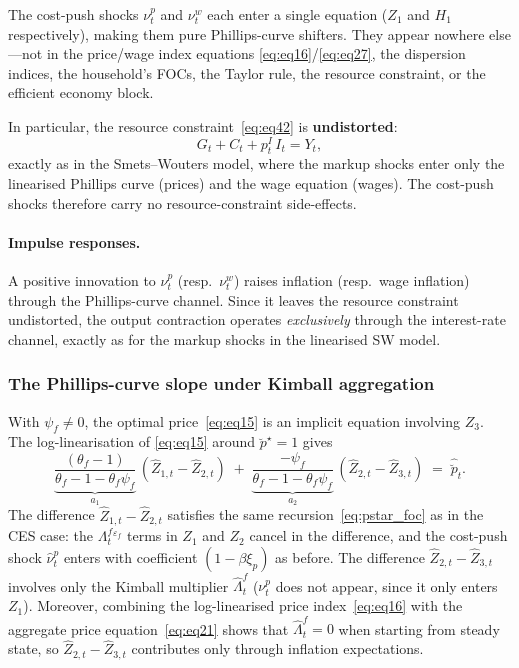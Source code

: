 \documentclass[11pt,a4paper]{article}
\renewcommand{\ss}{\star}
\begin{document}
\noindent
The cost-push shocks $\nu^p_t$ and $\nu^w_t$ each enter a single
equation ($Z_1$ and $H_1$ respectively), making them pure Phillips-curve
shifters.  They appear nowhere else---not in the price/wage index
equations \eqref{eq:eq16}/\eqref{eq:eq27}, the dispersion indices, the
household's FOCs, the Taylor rule, the resource constraint, or the
efficient economy block.

In particular, the resource constraint~\eqref{eq:eq42} is
\textbf{undistorted}:
\[
  G_t + C_t + p^I_t\,I_t = Y_t,
\]
exactly as in the Smets--Wouters model, where the markup shocks enter
only the linearised Phillips curve (prices) and the wage equation
(wages). The cost-push shocks therefore carry no resource-constraint
side-effects.

\paragraph{Impulse responses.}
A positive innovation to $\nu^p_t$ (resp.\ $\nu^w_t$) raises inflation
(resp.\ wage inflation) through the Phillips-curve channel.  Since it
leaves the resource constraint undistorted, the output contraction
operates \emph{exclusively} through the interest-rate channel, exactly
as for the markup shocks in the linearised SW model.

\subsubsection{The Phillips-curve slope under Kimball aggregation}
\label{sec:kimball_slope}

With $\psi_f \neq 0$, the optimal price~\eqref{eq:eq15} is an
implicit equation involving $Z_3$.  The log-linearisation of
\eqref{eq:eq15} around $\breve p^\ss = 1$ gives
\[
  \underbrace{\frac{(\theta_f-1)}
    {\theta_f-1-\theta_f\psi_f}}_{\displaystyle a_1}
  \,(\hat Z_{1,t} - \hat Z_{2,t})
  \;+\;
  \underbrace{\frac{-\psi_f}
    {\theta_f-1-\theta_f\psi_f}}_{\displaystyle a_2}
  \,(\hat Z_{2,t} - \hat Z_{3,t})
  \;=\; \hat{\breve p}_t.
\]
The difference $\hat Z_{1,t} - \hat Z_{2,t}$ satisfies the same
recursion~\eqref{eq:pstar_foc} as in the CES case: the
$\Lambda^f_t{}^{\varepsilon_f}$ terms in $Z_1$ and $Z_2$ cancel in
the difference, and the cost-push shock $\hat\nu^p_t$ enters with
coefficient $(1-\beta\xi_p)$ as before.  The difference
$\hat Z_{2,t} - \hat Z_{3,t}$ involves only the Kimball multiplier
$\hat\Lambda^f_t$ ($\nu^p_t$ does not appear, since it only enters
$Z_1$).  Moreover, combining
the log-linearised price index~\eqref{eq:eq16} with the aggregate
price equation~\eqref{eq:eq21} shows that $\hat\Lambda^f_t = 0$
when starting from steady state, so
$\hat Z_{2,t} - \hat Z_{3,t}$ contributes only through inflation
expectations.
\end{document}

